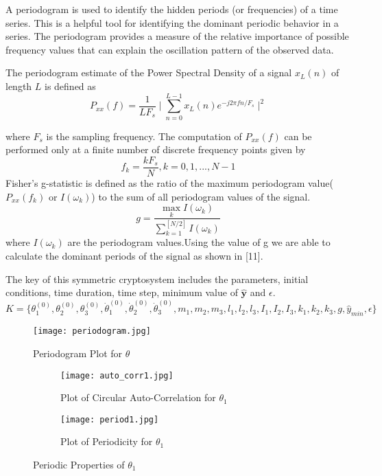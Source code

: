 A periodogram is used to identify the hidden periods (or frequencies) of a time series. This is a helpful tool for identifying the dominant periodic behavior in a series. The periodogram provides a measure of the relative importance of possible frequency values that can explain the oscillation pattern of the observed data.

The periodogram estimate of the Power Spectral Density of a signal $x_{L}(n)$ of length $L$ is defined as
\begin{equation}
 P_{xx}(f) = \frac{1}{LF_{s}} \mid \sum_{n=0}^{L-1} x_{L}(n)e^{-j2\pi fn/F_{s}} \mid^2
\end{equation}

where $F_{s}$ is the sampling frequency.
The computation of $P_{xx}(f)$ can be performed only at a finite number of discrete frequency points given by
\begin{equation}
 f_{k} = \frac{kF_{s}}{N} , k = 0,1, ... , N-1 
\end{equation}
Fisher's g-statistic is defined as the ratio of the maximum periodogram value($P_{xx}(f_{k})$ or $I(\omega_{k})$) to the sum of all periodogram values of the signal.
\begin{equation}
    g = \frac{\max_{k} I(\omega_{k})}{\sum_{k=1}^{[N/2]}I(\omega_{k})}  
\end{equation}
where $I(\omega_{k})$ are the periodogram values.Using the value of g we are able to calculate the dominant periods of the signal as shown in [11].

The key of this symmetric cryptosystem includes the parameters, initial conditions, time duration, time step, minimum value of $\hat{\textbf{y}}$ and $\epsilon$.\\

$K=\{\theta^{(0)}_{1},\theta^{(0)}_{2},\theta^{(0)}_{3},\dot{\theta}^{(0)}_{1},\dot{\theta}^{(0)}_{2},\dot{\theta}^{(0)}_{3}, m_{1},m_{2},m_{3}, l_{1},l_{2},l_{3}, I_{1},I_{2},I_{3}, k_{1},k_{2},k_{3}, g, \hat{y}_{min}, \epsilon \}$
\begin{figure}[H]
\centering
\texttt{[image: periodogram.jpg]}
\caption{Periodogram Plot for ${\theta}$}\label{fig:periodogram}
\end{figure}


\begin{figure}[H]
\begin{subfigure}{0.5\textwidth}
\texttt{[image: auto\_corr1.jpg]}
\caption{Plot of Circular Auto-Correlation for ${\theta_{1}}$}\label{fig:cir_auto1}
\end{subfigure}
\begin{subfigure}{0.5\textwidth}
\texttt{[image: period1.jpg]}
\caption{Plot of Periodicity for ${\theta_{1}}$}\label{fig:period1}
\end{subfigure}
\caption{Periodic Properties of ${\theta_{1}}$}\label{fig:image4}
\end{figure}

